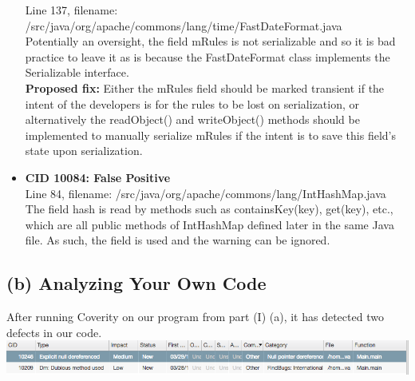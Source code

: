 \documentclass{article}
\begin{document}
\begin{itemize}
    Line 137, filename: /src/java/org/apache/commons/lang/time/FastDateFormat.java \\
    Potentially an oversight, the field mRules is not serializable and so it is bad practice to leave it 
    as is because the FastDateFormat class implements the Serializable interface. \\
    \textbf{Proposed fix:} Either the mRules field should be marked transient if the intent of the developers 
    is for the rules to be lost on serialization, or alternatively the readObject() and writeObject() methods 
    should be implemented to manually serialize mRules if the intent is to save this field's state upon serialization.
\item \textbf{CID 10084: False Positive} \\
    Line 84, filename: /src/java/org/apache/commons/lang/IntHashMap.java \\
    The field hash is read by methods such as containsKey(key), get(key), etc., which are all public methods of
    IntHashMap defined later in the same Java file. As such, the field is used and the warning can be ignored.
\end{itemize}

\subsection*{(b) Analyzing Your Own Code}
After running Coverity on our program from part (I) (a), it has detected two defects in our code. \\
\includegraphics[scale=0.5]{ss/coverity_bugs.png} \\
\end{document}
